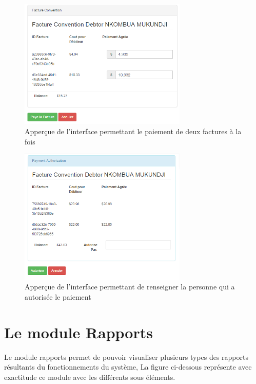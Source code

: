 \documentclass[12pt,a4paper]{report}
\begin{document}
\begin{figure}[h]
\begin{center}
\includegraphics[width=8cm]{pic/DoubleConvention.png}
\end{center}
\caption{Apperçue de l'interface permettant le paiement de deux factures à la fois}
\label{Apperçue de l'interface permettant le paiement de deux factures à la fois}
\end{figure}


\begin{figure}[h]
\begin{center}
\includegraphics[width=8cm]{pic/PCConfirm.png}
\end{center}
\caption{Apperçue de l'interface permettant de renseigner la personne qui a autorisée le paiement}
\label{Apperçue de l'interface permettant de renseigner la personne qui a autorisée le paiement}
\end{figure}
\newpage


\newpage
\chapter{Le module Rapports}        
Le module rapports permet de pouvoir visualiser plusieurs types des rapports résultants du fonctionnements du système, La figure ci-dessous représente avec exactitude ce module avec les différents sous éléments.
\end{document}
